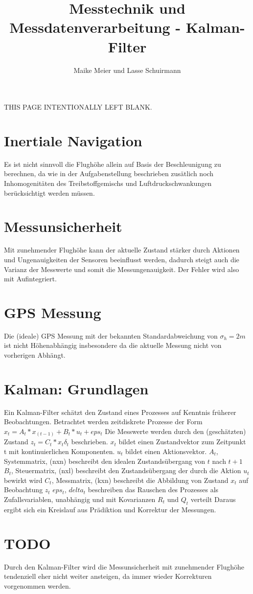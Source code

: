 \documentclass[12pt,a4paper]{article}
\author{Maike Meier und Lasse Schuirmann}
\title{Messtechnik und Messdatenverarbeitung - Kalman-Filter}
\newcommand*{\blankpage}{
  \vspace*{\fill}
  \begin{flushright}
  \tiny THIS PAGE INTENTIONALLY LEFT BLANK.
  \end{flushright}
  \pagebreak
}
\begin{document}

\maketitle
\pagebreak

\blankpage

\section{Inertiale Navigation}
Es ist nicht sinnvoll die Flughöhe allein auf Basis der Beschleunigung zu berechnen, da wie in der Aufgabenstellung beschrieben zusätlich noch Inhomogenitäten des Treibstoffgemischs und Luftdruckschwankungen berücksichtigt werden müssen.

\section{Messunsicherheit}
Mit zunehmender Flughöhe kann der aktuelle Zustand stärker durch Aktionen und 
Ungenauigkeiten der Sensoren beeinflusst werden, dadurch steigt auch die 
Varianz der Messwerte und somit die Messungenauigkeit. Der Fehler wird also mit Aufintegriert.

\section{GPS Messung}
Die (ideale) GPS Messung mit der bekannten Standardabweichung von $\sigma_h = 2m$ ist nicht Höhenabhängig insbesondere da die aktuelle Messung nicht von vorherigen Abhängt.

\section{Kalman: Grundlagen}
Ein Kalman-Filter schätzt den Zustand eines Prozesses auf Kenntnis früherer Beobachtungen.
Betrachtet werden zeitdiskrete Prozesse der Form 
$x_t = A_t * x_(t-1) + B_t *u_t + eps_t$
Die Messwerte werden durch den (geschätzten) Zustand $z_t = C_t * x_t  \delta_t$ beschrieben.
$x_t$ bildet einen Zustandvektor zum Zeitpunkt t mit kontinuierlichen Komponenten.
$u_t$ bildet einen Aktionsvektor.
$A_t$, Systemmatrix, (nxn) beschreibt den idealen Zustandsübergang von $t$ nach $t+1$
$B_t$, Steuermatrix, (nxl) beschreibt den Zustandsübergang der durch die Aktion $u_t$ bewirkt wird
$C_t$, Messmatrix, (kxn) beschreibt die Abbildung von Zustand $x_t$ auf Beobachtung $z_t$
$eps_t$, $delta_t$ beschreiben das Rauschen des Prozesses als Zufallsvariablen, unabhängig und mit
Kovarianzen $R_t$ und $Q_t$ verteilt
Daraus ergibt sich ein Kreislauf aus Prädiktion und Korrektur der Messungen.

\section{TODO}
Durch den Kalman-Filter wird die Messunsicherheit mit zunehmender Flughöhe tendenziell eher nicht
weiter ansteigen, da immer wieder Korrekturen vorgenommen werden.
\end{document}
